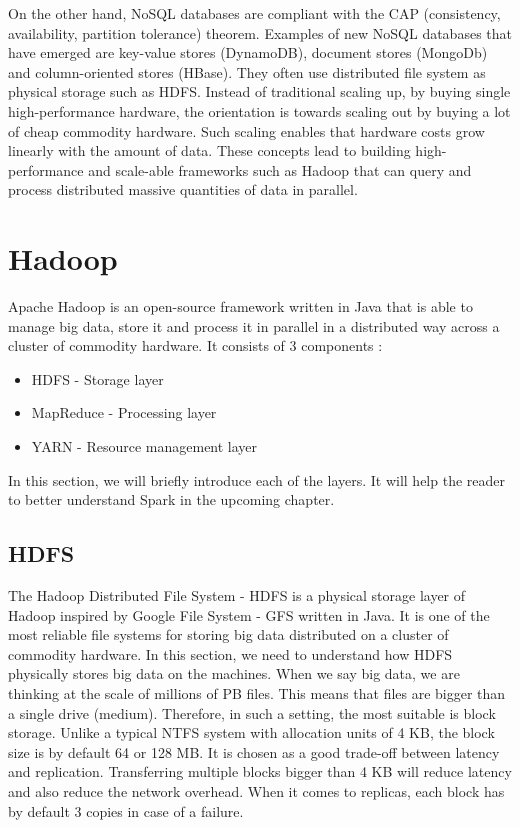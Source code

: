 On the other hand, NoSQL databases are compliant with the CAP (consistency, availability, partition tolerance) theorem.  Examples of new NoSQL databases that have emerged are key-value stores (DynamoDB), document stores (MongoDb) and column-oriented stores (HBase). They often use distributed file system as physical storage such as HDFS. Instead of traditional scaling up, by buying single high-performance hardware, the orientation is towards scaling out by buying a lot of cheap commodity hardware. Such scaling enables that hardware costs grow linearly with the amount of data.  These concepts lead to building high-performance and scale-able frameworks such as Hadoop that can query and process distributed massive quantities of data in parallel. \cite{BigDataCourse} %

\section{Hadoop}
Apache Hadoop \cite{Hadoop} is an open-source framework written in Java that is able to manage big data, store it and process it in parallel in a distributed way across a cluster of commodity hardware. It consists of 3 components \cite{BigDataCourse}: %
\begin{itemize}
	\item HDFS - Storage layer
	\item MapReduce - Processing layer
	\item YARN - Resource management layer
\end{itemize}

In this section, we will briefly introduce each of the layers. It will help the reader to better understand Spark in the upcoming chapter.

\subsection{HDFS}
The Hadoop Distributed File System - HDFS \cite{HDFS} is a physical storage layer of Hadoop inspired by Google File System - GFS \cite{GFS} written in Java. It is one of the most reliable file systems for storing big data distributed on a cluster of commodity hardware. In this section, we need to understand how HDFS physically stores big data on the machines. When we say big data, we are thinking at the scale of millions of PB files. This means that files are bigger than a single drive (medium). Therefore, in such a setting, the most suitable is block storage. Unlike a typical NTFS system with allocation units of 4 KB, the block size is by default 64 or 128 MB. It is chosen as a good trade-off between latency and replication. Transferring multiple blocks bigger than 4 KB will reduce latency and also reduce the network overhead. When it comes to replicas, each block has by default 3 copies in case of a failure.  

